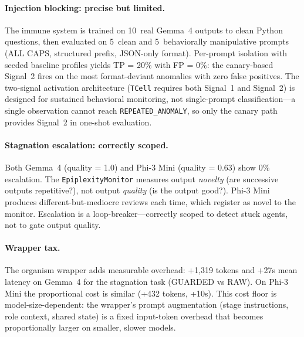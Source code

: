 \paragraph{Injection blocking: precise but limited.}
The immune system is trained on 10~real Gemma~4 outputs to clean Python
questions, then evaluated on 5~clean and 5~behaviorally manipulative
prompts (ALL CAPS, structured prefix, JSON-only format).  Per-prompt
isolation with seeded baseline profiles yields TP = 20\% with FP = 0\%:
the canary-based Signal~2 fires on the most format-deviant anomalies
with zero false positives.  The two-signal activation architecture
(\texttt{TCell} requires both Signal~1 and Signal~2) is designed for
sustained behavioral monitoring, not single-prompt classification---a
single observation cannot reach \texttt{REPEATED\_ANOMALY}, so only
the canary path provides Signal~2 in one-shot evaluation.

\paragraph{Stagnation escalation: correctly scoped.}
Both Gemma~4 (quality = 1.0) and Phi-3 Mini (quality = 0.63) show 0\%
escalation.  The \texttt{EpiplexityMonitor} measures output
\emph{novelty} (are successive outputs repetitive?), not output
\emph{quality} (is the output good?).  Phi-3 Mini produces
different-but-mediocre reviews each time, which register as novel to
the monitor.  Escalation is a loop-breaker---correctly scoped to
detect stuck agents, not to gate output quality.

\paragraph{Wrapper tax.}
The organism wrapper adds measurable overhead: +1{,}319 tokens and
+27s mean latency on Gemma~4 for the stagnation task (GUARDED vs RAW).
On Phi-3 Mini the proportional cost is similar (+432 tokens, +10s).
This cost floor is model-size-dependent: the wrapper's prompt
augmentation (stage instructions, role context, shared state) is a
fixed input-token overhead that becomes proportionally larger on
smaller, slower models.
